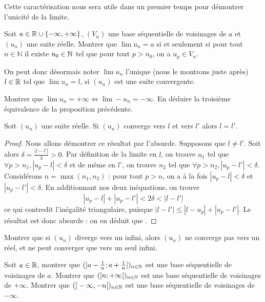 Cette caractérisation nous sera utile dans un premier temps pour démontrer l'unicité de la limite.

\begin{exo}
    Soit $a\in\mathbb{R}\cup\{-\infty,+\infty\}$, $(V_n)$ une base séquentielle de voisinages de $a$ et $(u_n)$ une suite réelle. Montrer que $\lim u_n = a$ si et seulement si pour tout $n\in\mathbb N$ il existe $n_0\in\mathbb{N}$ tel que pour tout $p > n_0$, on a $u_p \in V_n$.
\end{exo}

On peut donc désormais noter $\lim u_n$ l'unique (nous le montrons juste après) $l\in\mathbb{R}$ tel que $\lim u_n = l$, si $(u_n)$ est une suite convergente.

\begin{exo}
    Montrer que $\lim u_n = +\infty \iff \lim -u_n = -\infty$. En déduire la troisième équivalence de la proposition précédente.
\end{exo}

\begin{prop}
    Soit $(u_n)$ une suite réelle. Si $(u_n)$ converge vers $l$ et vers $l'$ alors $l=l'$.
\end{prop}

\begin{proof}
    Nous allons démontrer ce résultat par l'absurde. Supposons que $l\neq l'$. Soit alors $\delta = \displaystyle{\frac{|l-l'|}{3}} > 0$. Par définition de la limite en $l$, on trouve $n_1$ tel que $\forall p > n_1, |u_p-l| < \delta$ et de même en $l'$, on trouve $n_2$ tel que $\forall p > n_2, |u_p - l'| < \delta$. Considérons $n = \max(n_1,n_2)$ : pour tout $p > n$, on a à la fois $|u_p-l| < \delta$ et $|u_p - l'| < \delta$. En additionnant nos deux inéquations, on trouve $$|u_p - l| + |u_p-l'| < 2\delta < |l-l'|$$ ce qui contredit l'inégalité triangulaire, puisque $|l-l'|\leq |l-u_p| + |u_p - l'|$. Le résultat est donc absurde : on en déduit que .
\end{proof}

\begin{exo}
    Montrer que si $(u_n)$ diverge vers un infini, alors $(u_n)$ ne converge pas vers un réel, et ne peut converger que vers un seul infini.
\end{exo}

\begin{exo}
    Soit $a\in\mathbb{R}$, montrer que $(]a-\frac{1}{n};a+\frac{1}{n}[)_{n\in\mathbb{N}}$ est une base séquentielle de voisinages de $a$. Montrer que $(]n;+\infty[)_{n\in\mathbb{N}}$ est une base séquentielle de voisinages de $+\infty$. Montrer que $(]-\infty,-n[)_{n\in\mathbb{N}}$ est une base séquentielle de voisinages de $-\infty$.
\end{exo}

